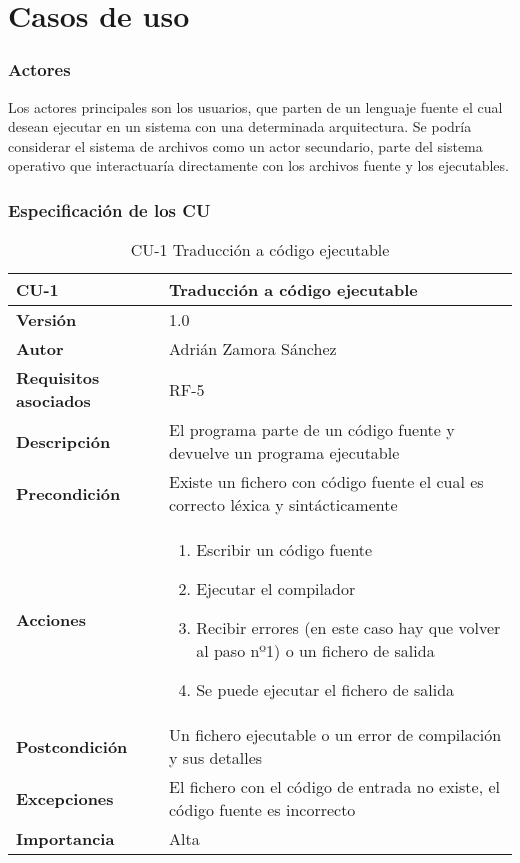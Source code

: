\section{Casos de uso}
\subsubsection{Actores}
Los actores principales son los usuarios, que parten de un lenguaje fuente el cual desean ejecutar en un sistema con una determinada arquitectura. Se podría considerar el sistema de archivos como un actor secundario, parte del sistema operativo que interactuaría directamente con los archivos fuente y los ejecutables.

\subsubsection{Especificación de los CU}
\begin{table}[p]
	\centering
	\begin{tabularx}{\linewidth}{ p{} p{} }
		\toprule
		\textbf{CU-1}    & \textbf{Traducción a código ejecutable}\\
		\toprule
		\textbf{Versión}              & 1.0    \\
		\textbf{Autor}                & Adrián Zamora Sánchez \\
		\textbf{Requisitos asociados} & RF-5\\
		\textbf{Descripción}          & El programa parte de un código fuente y devuelve un programa ejecutable \\
		\textbf{Precondición}         & Existe un fichero con código fuente el cual es correcto léxica y sintácticamente \\
		\textbf{Acciones}             &
		\begin{enumerate}
			\def\labelenumi{\arabic{enumi}.}
			\tightlist
			\item Escribir un código fuente
			\item Ejecutar el compilador
			\item Recibir errores (en este caso hay que volver al paso nº1) o un fichero de salida 
			\item Se puede ejecutar el fichero de salida
		\end{enumerate}\\
		\textbf{Postcondición}        & Un fichero ejecutable o un error de compilación y sus detalles \\
		\textbf{Excepciones}          & El fichero con el código de entrada no existe, el código fuente es incorrecto \\
		\textbf{Importancia}          & Alta \\ 
		\bottomrule
	\end{tabularx}
	\caption{CU-1 Traducción a código ejecutable}
\end{table}

